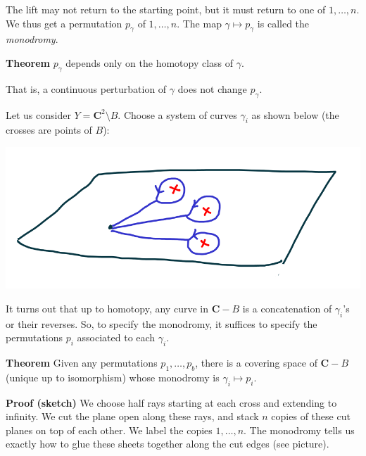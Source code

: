 \documentclass[11pt]{article}
\begin{document}
The lift may not return to the starting point, but it must return to one of \(1, \dots, n\).
We thus get a permutation \(p_{\gamma}\) of \(1,\dots, n\).
The map \(\gamma \mapsto p_{\gamma}\) is called the \emph{monodromy}.

\textbf{\textbf{Theorem}} \(p_{\gamma}\) depends only on the homotopy class of \(\gamma\).

That is, a continuous perturbation of \(\gamma\) does not change \(p_{\gamma}\).

Let us consider \(Y = \mathbf{C}^2 \setminus B\).
Choose a system of curves \(\gamma_{i}\) as shown below (the crosses are points of \(B\)):
\begin{center}
\includegraphics[width=.9\linewidth]{assets/Course_notes/2023-03-24_14-58-52_screenshot.png}
\end{center}
It turns out that up to homotopy, any curve in \(\mathbf{C}-B\) is a concatenation of \(\gamma_i\)'s or their reverses.
So, to specify the monodromy, it suffices to specify the permutations \(p_i\) associated to each \(\gamma_{i}\).

\textbf{\textbf{Theorem}} Given any permutations \(p_1, \dots, p_{b}\), there is a covering space of \(\mathbf{C}-B\) (unique up to isomorphism) whose monodromy is \(\gamma_{i} \mapsto p_i\).

\textbf{\textbf{Proof (sketch)}} 
We choose half rays starting at each cross and extending to infinity.
We cut the plane open along these rays, and stack \(n\) copies of these cut planes on top of each other.
We label the copies \(1,\dots, n\).
The monodromy tells us exactly how to glue these sheets together along the cut edges (see picture).
\end{document}
